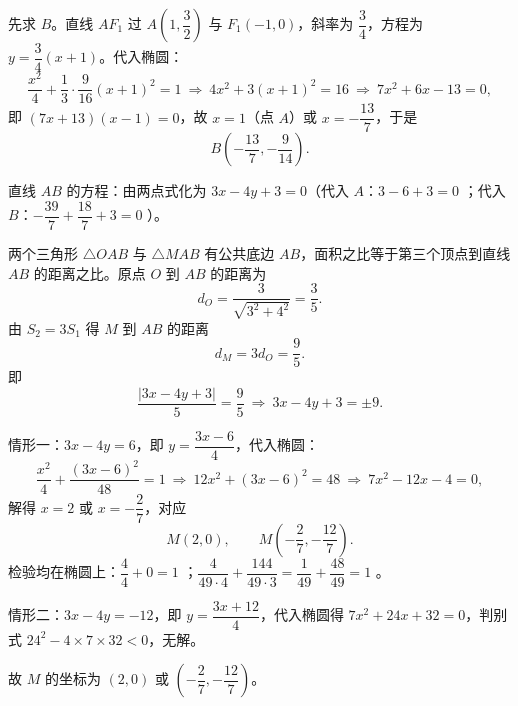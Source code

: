 \begin{answer}

先求 $B$。直线 $AF_1$ 过 $A\left(1,\dfrac32\right)$ 与 $F_1(-1,0)$，斜率为 $\dfrac34$，方程为 $y=\dfrac34(x+1)$。代入椭圆：
\nopagebreak[4]
\[\frac{x^2}4+\frac{1}{3}\cdot\frac{9}{16}(x+1)^2=1\ \Longrightarrow\ 4x^2+3(x+1)^2=16\ \Longrightarrow\ 7x^2+6x-13=0,\]
即 $(7x+13)(x-1)=0$，故 $x=1$（点 $A$）或 $x=-\dfrac{13}7$，于是
\nopagebreak[4]
\[B\left(-\frac{13}7,-\frac9{14}\right).\]

直线 $AB$ 的方程：由两点式化为 $3x-4y+3=0$（代入 $A$：$3-6+3=0$ ；代入 $B$：$-\dfrac{39}7+\dfrac{18}7+3=0$ ）。

两个三角形 $\triangle OAB$ 与 $\triangle MAB$ 有公共底边 $AB$，面积之比等于第三个顶点到直线 $AB$ 的距离之比。原点 $O$ 到 $AB$ 的距离为
\nopagebreak[4]
\[d_O=\frac{3}{\sqrt{3^2+4^2}}=\frac35 .\]
由 $S_2=3S_1$ 得 $M$ 到 $AB$ 的距离
\nopagebreak[4]
\[d_M=3d_O=\frac95 .\]
即
\nopagebreak[4]
\[\frac{|3x-4y+3|}{5}=\frac95\ \Longrightarrow\ 3x-4y+3=\pm9 .\]

情形一：$3x-4y=6$，即 $y=\dfrac{3x-6}{4}$，代入椭圆：
\nopagebreak[4]
\[\frac{x^2}4+\frac{(3x-6)^2}{48}=1\ \Longrightarrow\ 12x^2+(3x-6)^2=48\ \Longrightarrow\ 7x^2-12x-4=0,\]
解得 $x=2$ 或 $x=-\dfrac27$，对应
\nopagebreak[4]
\[M(2,0),\qquad M\left(-\frac27,-\frac{12}7\right).\]
检验均在椭圆上：$\dfrac44+0=1$ ；$\dfrac{4}{49\cdot4}+\dfrac{144}{49\cdot3}=\dfrac1{49}+\dfrac{48}{49}=1$ 。

情形二：$3x-4y=-12$，即 $y=\dfrac{3x+12}{4}$，代入椭圆得 $7x^2+24x+32=0$，判别式 $24^2-4\times7\times32<0$，无解。

故 $M$ 的坐标为 $(2,0)$ 或 $\left(-\dfrac27,-\dfrac{12}7\right)$。




\end{answer}
